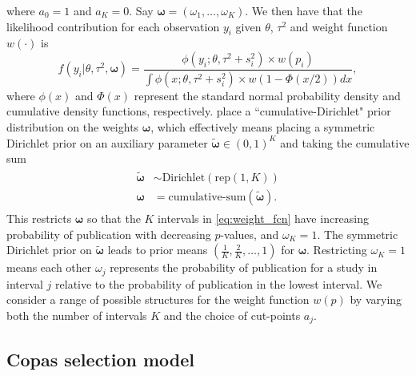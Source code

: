 \documentclass[12pt]{article}   	%
\numberwithin{equation}{section}
\begin{document}
where $a_0 = 1$ and $a_K = 0$. Say $\boldsymbol{\omega} = (\omega_1, \dots, \omega_K)$. We then have that the likelihood contribution for each observation $y_i$ given $\theta$, $\tau^2$ and weight function $w(\cdot)$ is 
\begin{equation} %
f(y_i \vert \theta, \tau^2, \boldsymbol{\omega}) = \frac{\phi(y_i ; \theta, \tau^2 + s_i^2) \times w(p_i)}{\int \phi(x ; \theta, \tau^2 + s_i^2) \times w(1 - \Phi(x/2)) dx}, \label{eq:weightednormal}
\end{equation}
where $\phi(x)$ and $\Phi(x)$ represent the standard normal probability density and cumulative density functions, respectively. \citet{maier2020robma} place a ``cumulative-Dirichlet" prior distribution on the weights $\boldsymbol{\omega}$, which effectively means placing a symmetric Dirichlet prior on an auxiliary parameter $\widetilde{\boldsymbol{\omega}} \in (0, 1)^K$ and taking the cumulative sum 
\begin{align}
\begin{split}
\widetilde{\boldsymbol{\omega}} & \sim \text{Dirichlet}(\text{rep}(1, K))  \\
\boldsymbol{\omega} &= \text{cumulative-sum}(\widetilde{\boldsymbol{\omega}}). 
\end{split}
\end{align}
This restricts $\boldsymbol{\omega}$ so that the $K$ intervals in \eqref{eq:weight_fcn} have increasing probability of publication with decreasing $p$-values, and $\omega_K = 1$. The symmetric Dirichlet prior on $\widetilde{\boldsymbol{\omega}}$ leads to prior means $(\frac{1}{K}, \frac{2}{K}, \dots, 1)$ for $\boldsymbol{\omega}$. Restricting $\omega_K = 1$ means each other $\omega_j$ represents the probability of publication for a study in interval $j$ relative to the probability of publication in the lowest interval. We consider a range of possible structures for the weight function $w(p)$ by varying both the number of intervals $K$ and the choice of cut-points $a_j$.


\subsection{Copas selection model} \label{sec:copas}
\end{document}
